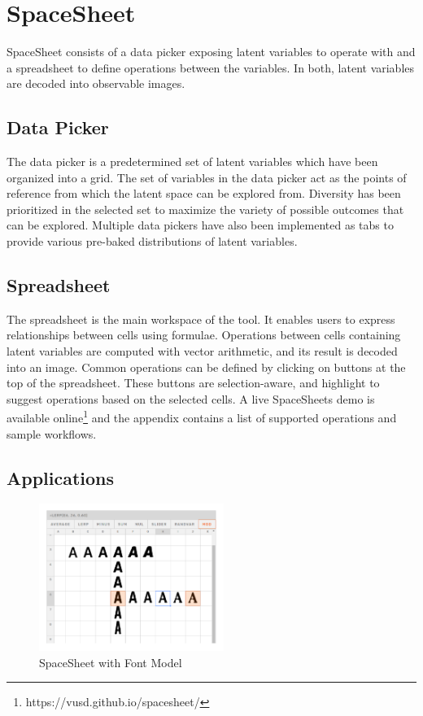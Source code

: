 \documentclass[letterpaper]{article}
\begin{document}
\section{SpaceSheet}

SpaceSheet consists of a data picker exposing latent variables to operate with and a spreadsheet to define operations between the variables. In both, latent variables are decoded into observable images.

\subsection{Data Picker}

The data picker is a predetermined set of latent variables which have been organized into a grid. The set of variables in the data picker act as the points of reference from which the latent space can be explored from. Diversity has been prioritized in the selected set to maximize the variety of possible outcomes that can be explored. Multiple data pickers have also been implemented as tabs to provide various pre-baked distributions of latent variables.

\subsection{Spreadsheet}

The spreadsheet is the main workspace of the tool. It enables users to express relationships between cells using formulae. Operations between cells containing latent variables are computed with vector arithmetic, and its result is decoded into an image. Common operations can be defined by clicking on buttons at the top of the spreadsheet. These buttons are selection-aware, and highlight to suggest operations based on the selected cells. A live SpaceSheets demo is available online\footnote{https://vusd.github.io/spacesheet/} and the appendix contains a list of supported operations and sample workflows.

\subsection{Applications}

\begin{figure}[ht]
  \centering
  \includegraphics[width=6cm]{figs/02A-use-cases.png}
  \caption{SpaceSheet with Font Model}
\end{figure}
\end{document}
